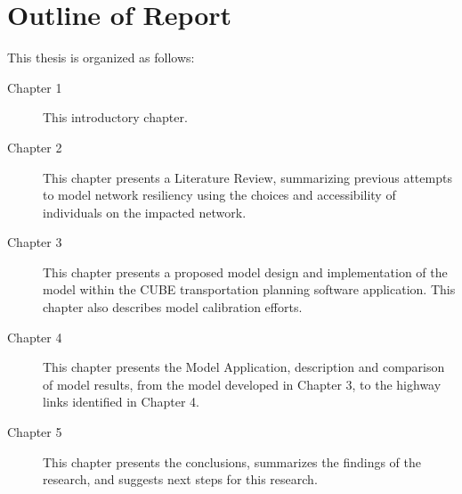 \newpage
\section{Outline of Report}

\noindent This thesis is organized as follows:

\begin{description}
	\item [Chapter 1]	{This introductory chapter.}
	\item [Chapter 2]	{This chapter presents a Literature Review, summarizing previous attempts to model network resiliency using the choices and accessibility of individuals on the impacted network.}
	\item [Chapter 3]	{This chapter presents a proposed model design and implementation of the model within the CUBE transportation planning software application. This chapter also describes model calibration efforts.}
  \item [Chapter 4]	{This chapter presents the Model Application, description and comparison of model results, from the model developed in Chapter 3, to the highway links identified in Chapter 4.}
	\item [Chapter 5]	{This chapter presents the conclusions, summarizes the findings of the research, and suggests next steps for this research.}
\end{description}
